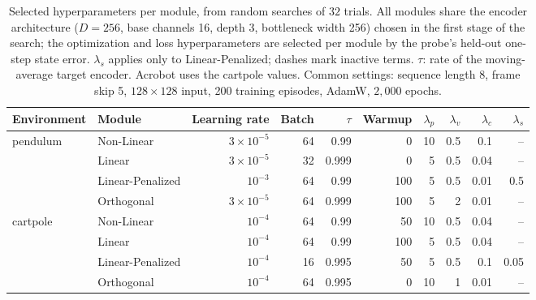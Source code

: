 \begin{table}[t]
\caption{Selected hyperparameters per module, from random searches of $32$ trials. All modules share the encoder architecture ($D{=}256$, base channels 16, depth 3, bottleneck width 256) chosen in the first stage of the search; the optimization and loss hyperparameters are selected per module by the probe's held-out one-step state error. $\lambda_s$ applies only to Linear-Penalized; dashes mark inactive terms. $\tau$: rate of the moving-average target encoder. Acrobot uses the cartpole values. Common settings: sequence length 8, frame skip 5, $128{\times}128$ input, 200 training episodes, AdamW, $2{,}000$ epochs.}
\label{tab:hyperparams}
\centering\scriptsize
\begin{tabular}{@{}llrrrrrrrr@{}}
\toprule
Environment & Module & Learning rate & Batch & $\tau$ & Warmup & $\lambda_p$ & $\lambda_v$ & $\lambda_c$ & $\lambda_s$ \\
\midrule
pendulum & Non-Linear & $3{\times}10^{-5}$ & 64 & 0.99 & 0 & 10 & 0.5 & 0.1 & -- \\
 & Linear & $3{\times}10^{-5}$ & 32 & 0.999 & 0 & 5 & 0.5 & 0.04 & -- \\
 & Linear-Penalized & $10^{-3}$ & 64 & 0.99 & 100 & 5 & 0.5 & 0.01 & 0.5 \\
 & Orthogonal & $3{\times}10^{-5}$ & 64 & 0.999 & 100 & 5 & 2 & 0.01 & -- \\
\midrule
cartpole & Non-Linear & $10^{-4}$ & 64 & 0.99 & 50 & 10 & 0.5 & 0.04 & -- \\
 & Linear & $10^{-4}$ & 64 & 0.99 & 100 & 5 & 0.5 & 0.04 & -- \\
 & Linear-Penalized & $10^{-4}$ & 16 & 0.995 & 50 & 5 & 0.5 & 0.1 & 0.05 \\
 & Orthogonal & $10^{-4}$ & 64 & 0.995 & 0 & 10 & 1 & 0.01 & -- \\
\bottomrule
\end{tabular}
\end{table}
